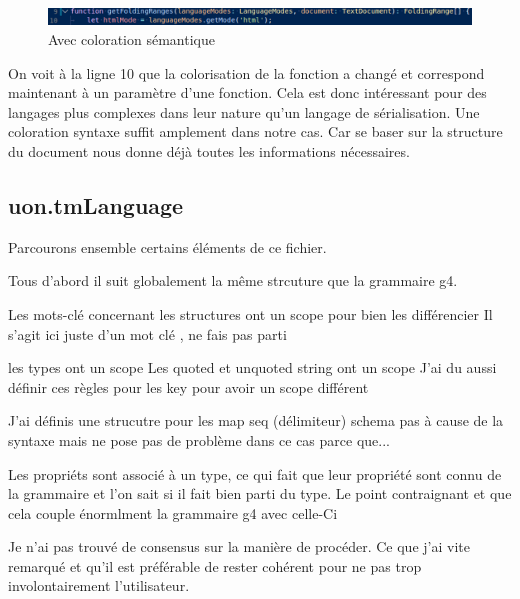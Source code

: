 \documentclass[
    iict, %
    il, %
]{heig-tb}
\begin{document}
\begin{figure}[!h]
    \begin{center}
        \includegraphics[width=15cm]{assets/figures/semantic-coloration-with.png}
    \end{center}
    \caption[Sans coloration sémantique ]{\label{semantic-coloration-with} Avec coloration sémantique }
\end{figure}

On voit à la ligne 10 que la colorisation de la fonction a changé et correspond maintenant à un paramètre d'une fonction.
Cela est donc intéressant pour des langages plus complexes dans leur nature qu'un langage de sérialisation. Une coloration syntaxe suffit amplement dans notre cas.
Car se baser sur la structure du document nous donne déjà toutes les informations nécessaires.

\subsection{uon.tmLanguage}

Parcourons ensemble certains éléments de ce fichier.

Tous d'abord il suit globalement la même strcuture que la grammaire g4.


Les mots-clé concernant les structures ont un scope pour bien les différencier
Il s'agit ici juste d'un mot clé , ne fais pas parti

les types ont un scope
Les quoted et unquoted string ont un scope
J'ai du aussi définir ces règles pour les key pour avoir un scope différent

J'ai définis une strucutre pour les map seq (délimiteur) schema pas à cause de la syntaxe mais ne pose pas de problème dans ce cas parce que...

Les propriéts sont associé à un type, ce qui fait que leur propriété sont connu de la grammaire et l'on sait si il fait bien parti du type.
Le point contraignant et que cela couple énormlment la grammaire g4 avec celle-Ci


Je n'ai pas trouvé de consensus sur la manière de procéder. Ce que j'ai vite remarqué et qu'il est préférable de rester cohérent pour ne pas
trop involontairement l'utilisateur.
\end{document}
